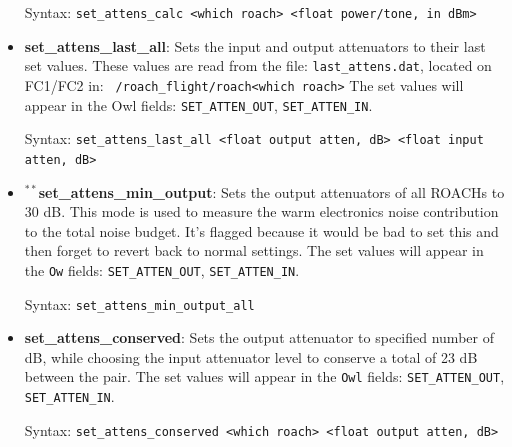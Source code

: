 \begin{itemize}[leftmargin=*,label={}]
Syntax: \texttt{set\_attens\_calc <which roach> <float power/tone, in dBm>}

\item \textbf{set\_attens\_last\_all}: Sets the input and output attenuators to their last set values. These values are read from the file: \texttt{last\_attens.dat}, located on FC1/FC2 in: \texttt{~/roach\_flight/roach<which roach>}
The set values will appear in the Owl fields: \texttt{SET\_ATTEN\_OUT}, \texttt{SET\_ATTEN\_IN}.

Syntax: \texttt{set\_attens\_last\_all <float output atten, dB> <float input atten, dB>}

\item $^{**}$\textbf{set\_attens\_min\_output}: Sets the output attenuators of all ROACHs to 30 dB. This mode is used to measure the warm electronics noise contribution to the total noise budget. It’s flagged because it would be bad to set this and then forget to revert back to normal settings. The set values will appear in the \texttt{Ow} fields: \texttt{SET\_ATTEN\_OUT}, \texttt{SET\_ATTEN\_IN}.

Syntax: \texttt{set\_attens\_min\_output\_all}

\item \textbf{set\_attens\_conserved}: Sets the output attenuator to specified number of dB, while choosing the input attenuator level to conserve a total of 23 dB between the pair. The set values will appear in the \texttt{Owl} fields: \texttt{SET\_ATTEN\_OUT}, \texttt{SET\_ATTEN\_IN}.

Syntax: \texttt{set\_attens\_conserved <which roach> <float output atten, dB>}

\end{itemize}

